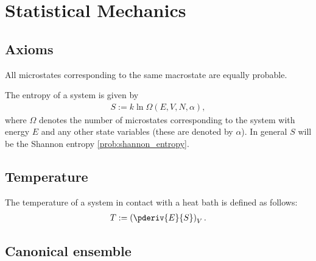 \chapter{Statistical Mechanics}

\section{Axioms}

    \begin{axiom}
        All microstates corresponding to the same macrostate are equally probable.
    \end{axiom}

    \begin{axiom}
        The entropy of a system is given by
        \begin{gather}
            \label{statmech:boltzmann_formula}
            S := k\ln\Omega(E,V,N,\alpha),
        \end{gather}
        where $\Omega$ denotes the number of microstates corresponding to the system with energy $E$ and any other state variables (these are denoted by $\alpha$). In general $S$ will be the Shannon entropy \ref{prob:shannon_entropy}.
    \end{axiom}

\section{Temperature}

    \begin{definition}\label{statmech:temperature}
        The temperature of a system in contact with a heat bath is defined as follows:
        \begin{gather}
            T := \left(\pderiv{E}{S}\right)_V.
        \end{gather}
    \end{definition}

\section{Canonical ensemble}


